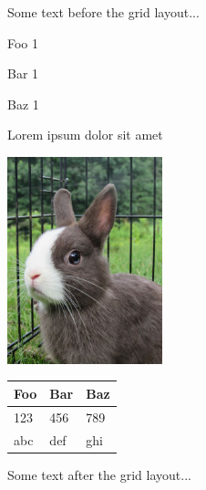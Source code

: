 \documentclass{article}
\begin{document}
Some text before the grid layout...

\begin{gridlayout}[\textwidth]
    \begin{row}{4cm}
        \begin{cell}{0.2}
            Foo 1
        \end{cell}
        \begin{cell}{0.4}
            Bar 1
        \end{cell}
        \begin{cell}{0.2}
            Baz 1
        \end{cell}
    \end{row}
    \begin{row}{6cm}
        \begin{cell}{0.1}
            Lorem ipsum dolor sit amet 
        \end{cell}
        \begin{cell}{0.5}
            \includegraphics[height = 6cm]{img/rabbit.jpg}
        \end{cell}
        \begin{cell}{0.4}
            \centering
            \begin{tabular}{lll}
                \toprule
                Foo & Bar & Baz \\
                \midrule
                123 & 456 & 789 \\
                abc & def & ghi \\
                \bottomrule
            \end{tabular}
        \end{cell}
    \end{row}
\end{gridlayout}

Some text after the grid layout...
\end{document}
